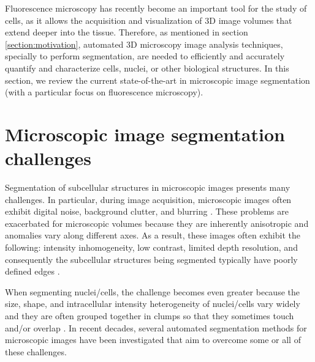 \label{chapter:state_of_the_art}

Fluorescence microscopy has recently become an important tool for the study of cells, as it allows the acquisition and visualization of \ac{3D} image volumes that extend deeper into the tissue. Therefore, as mentioned in section \ref{section:motivation}, automated \ac{3D} microscopy image analysis techniques, specially to perform segmentation, are needed to efficiently and accurately quantify and characterize cells, nuclei, or other biological structures. In this section, we review the current state-of-the-art in microscopic image segmentation (with a particular focus on fluorescence microscopy).


\section{Microscopic image segmentation challenges}

Segmentation of subcellular structures in microscopic images presents many challenges. In particular, during image acquisition, microscopic images often exhibit digital noise, background clutter, and blurring \cite{review:robust}. These problems are exacerbated for microscopic volumes because they are inherently anisotropic and anomalies vary along different axes. As a result, these images often exhibit the following: intensity inhomogeneity, low contrast, limited depth resolution, and consequently the subcellular structures being segmented typically have poorly defined edges \cite{active:inhmo}. 

When segmenting nuclei/cells, the challenge becomes even greater because the size, shape, and intracellular intensity heterogeneity of nuclei/cells vary widely and they are often grouped together in clumps so that they sometimes touch and/or overlap \cite{review:robust}. In recent decades, several automated segmentation methods for microscopic images have been investigated that aim to overcome some or all of these challenges.



